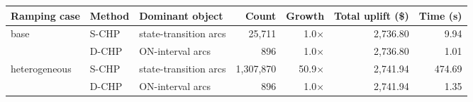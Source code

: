 \begin{tabular}{lllrrrr}
\toprule
Ramping case & Method & Dominant object & Count & Growth & Total uplift (\$) & Time (s) \\
\midrule
\multirow{2}{*}{base} & S-CHP & state-transition arcs & 25,711 & 1.0$\times$ & 2,736.80 & 9.94 \\
 & D-CHP & ON-interval arcs & 896 & 1.0$\times$ & 2,736.80 & 1.01 \\
\midrule
\multirow{2}{*}{heterogeneous} & S-CHP & state-transition arcs & 1,307,870 & 50.9$\times$ & 2,741.94 & 474.69 \\
 & D-CHP & ON-interval arcs & 896 & 1.0$\times$ & 2,741.94 & 1.35 \\
\bottomrule
\end{tabular}
